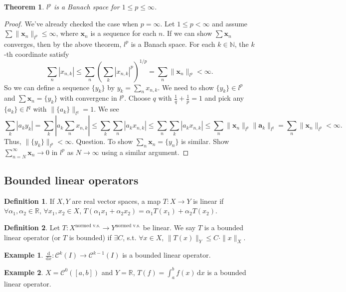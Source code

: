 \documentclass[12pt]{article}
\theoremstyle{plain}
\newtheorem{thm}{Theorem}
\theoremstyle{definition}
\newtheorem*{defn}{Definition}
\newtheorem*{eg}{Example}
\begin{document}
\begin{thm}
    $l^p$ is a Banach space for $1\leq p\leq \infty$.
\end{thm}
\begin{proof}
    We've already checked the case when $p=\infty$.
    Let $1\leq p<\infty$ and assume $\sum \|\bm{x}_n\|_{l^p} \leq \infty$, where $\bm{x}_n$ is a sequence for each $n$.
    If we can show $\sum \bm{x}_n$ converges, then by the above theorem, $l^p$ is a Banach space.
    For each $k\in\mathbb{N}$, the $k$-th coordinate satisfy
    \[
        \sum_n |x_{n,k}| \leq  \sum_n \left(\sum_k |x_{n,k}|^p\right)^{1/p} = \sum_n \|\bm{x}_n\|_{l^p} < \infty.
    \]
    So we can define a sequence $\{y_k\}$ by $y_k = \sum_n x_{n,k}$.
    We need to show $\{y_k\} \in l^p$ and $\sum \bm{x}_n = \{y_k\}$ with convergenc in $l^p$.
    Choose $q$ with $\frac{1}{q} + \frac{1}{p} = 1$ and pick any $\{a_k\}\in l^q$ with $\|\{a_k\}\|_{l^q} = 1$.
    We see
    \[
        \sum_k |a_ky_k| = \sum_k \left| a_k \sum_n x_{n,k}\right| \leq \sum_k \sum_n |a_k x_{n,k}|
        \leq \sum_n \sum_k |a_k x_{n,k}|
        \leq \sum_n \|\bm{x}_n\|_{l^p}\|\bm{a}_k\|_{l^q}
        = \sum_n \|\bm{x}_n\|_{l^p}
        < \infty.
    \]
    Thus, $\|\{y_k\}\|_{l^p}<\infty$.
    Question.
    To show $\sum_n \bm{x}_n = \{y_n\}$ is similar.
    Show $\sum_{n=N}^\infty \bm{x}_n\rightarrow 0$ in $l^p$ as $N\rightarrow\infty$ using a similar argument.
\end{proof}

\subsection*{Bounded linear operators}
\begin{defn}
    If $X, Y$ are real vector spaces, a map $T: X\rightarrow Y$ is linear if $\forall \alpha_1, \alpha_2\in \mathbb{R}$,
    $\forall x_1, x_2\in X$, $T(\alpha_1 x_1 + \alpha_2 x_2) = \alpha_1 T(x_1) + \alpha_2 T(x_2)$.
\end{defn}

\begin{defn}
    Let $T: X^{\text{normed v.s.}}\rightarrow Y^{\text{normed v.s.}}$ be linear.
    We say $T$ is a bounded linear operator (or $T$ is bounded) if $\exists C$, s.t. $\forall x\in X$,
    $\|T(x)\|_Y\leq C\cdot\|x\|_X.$
\end{defn}

\begin{eg}
    $\frac{\mathrm{d}}{\mathrm{d}x}: \mathcal{C}^k(I) \rightarrow \mathcal{C}^{k-1}(I)$ is a bounded linear operator.
\end{eg}
\begin{eg}
    $X = \mathcal{C}^0([a,b])$ and $Y=\mathbb{R}$, $T(f) = \int_a^b f(x)\,\mathrm{d}x$ is a bounded linear operator.
\end{eg}
\end{document}
